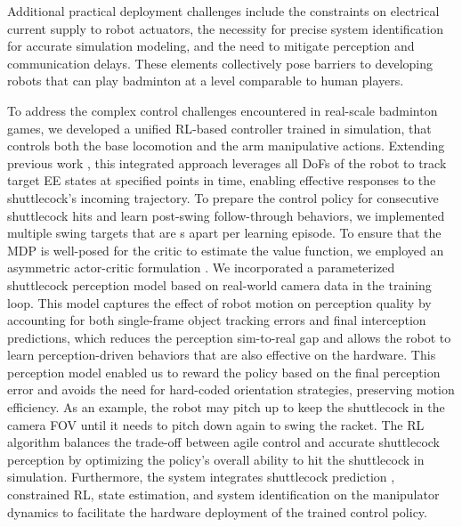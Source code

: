 \documentclass[9pt,twocolumn,twoside]{osajnl}
\begin{document}
Additional practical deployment challenges include the constraints on electrical current supply to robot actuators, the necessity for precise system identification for accurate simulation modeling, and the need to mitigate perception and communication delays. These elements collectively pose barriers to developing robots that can play badminton at a level comparable to human players.

To address the complex control challenges encountered in real-scale badminton games, we developed a unified \ac{RL}-based controller trained in simulation, that controls both the base locomotion and the arm manipulative actions. Extending previous work \cite{rudin2022advanced}, this integrated approach leverages all \acp{DoF} of the robot to track target \ac{EE} states at specified points in time, enabling effective responses to the shuttlecock's incoming trajectory. To prepare the control policy for consecutive shuttlecock hits and learn post-swing follow-through behaviors, we implemented multiple swing targets that are \unit[2]{s} apart per learning episode. To ensure that the \ac{MDP} is well-posed for the critic to estimate the value function, we employed an asymmetric actor-critic formulation \cite{pinto2017asymmetricactorcriticimagebased}. We incorporated a parameterized shuttlecock perception model based on real-world camera data in the training loop. This model captures the effect of robot motion on perception quality by accounting for both single-frame object tracking errors and final interception predictions, which reduces the perception sim-to-real gap and allows the robot to learn perception-driven behaviors that are also effective on the hardware. This perception model enabled us to reward the policy based on the final perception error and avoids the need for hard-coded orientation strategies, preserving motion efficiency. As an example, the robot may pitch up to keep the shuttlecock in the camera \ac{FOV} until it needs to pitch down again to swing the racket. The \ac{RL} algorithm balances the trade-off between agile control and accurate shuttlecock perception by optimizing the policy's overall ability to hit the shuttlecock in simulation. Furthermore, the system integrates shuttlecock prediction \cite{cohen2015physics}, constrained \ac{RL}\cite{lee2023evaluation}, state estimation\cite{khattak2020complementary,lynen13robust}, and system identification on the manipulator dynamics\cite{hwangbo2019learning,filip2024,tan2018sim} to facilitate the hardware deployment of the trained control policy.
\end{document}
